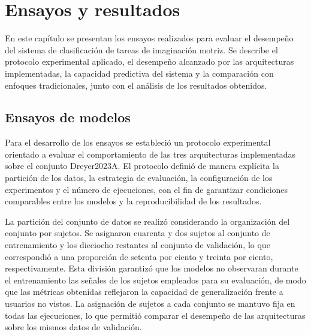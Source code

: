 
\chapter{Ensayos y resultados} %

\label{Chapter4} %

En este capítulo se presentan los ensayos realizados para evaluar el desempeño del sistema de clasificación de tareas de imaginación motriz. Se describe el protocolo experimental aplicado, el desempeño alcanzado por las arquitecturas implementadas, la capacidad predictiva del sistema y la comparación con enfoques tradicionales, junto con el análisis de los resultados obtenidos.


\section{Ensayos de modelos}
\label{sec:ensayosModelos}

Para el desarrollo de los ensayos se estableció un protocolo experimental orientado a evaluar el comportamiento de las tres arquitecturas implementadas sobre el conjunto Dreyer2023A. El protocolo definió de manera explícita la partición de los datos, la estrategia de evaluación, la configuración de los experimentos y el número de ejecuciones, con el fin de garantizar condiciones comparables entre los modelos y la reproducibilidad de los resultados.

La partición del conjunto de datos se realizó considerando la organización del conjunto por sujetos. Se asignaron cuarenta y dos sujetos al conjunto de entrenamiento y los dieciocho restantes al conjunto de validación, lo que correspondió a una proporción de setenta por ciento y treinta por ciento, respectivamente. Esta división garantizó que los modelos no observaran durante el entrenamiento las señales de los sujetos empleados para su evaluación, de modo que las métricas obtenidas reflejaron la capacidad de generalización frente a usuarios no vistos. La asignación de sujetos a cada conjunto se mantuvo fija en todas las ejecuciones, lo que permitió comparar el desempeño de las arquitecturas sobre los mismos datos de validación.

